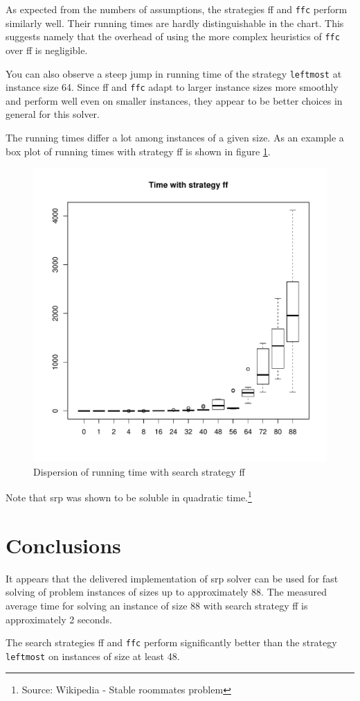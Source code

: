 \documentclass{article}
\newcommand{\code}[1]{\texttt{#1}}
\newcommand{\srp}{\acrshort{srp}}
\begin{document}
As expected from the numbers of assumptions,
the strategies \acrshort{ff} and \code{ffc} perform similarly well.
Their running times are hardly distinguishable in the chart.
This suggests namely that the overhead of using
the more complex heuristics of \code{ffc} over \acrshort{ff} is negligible.

You can also observe a steep jump in running time
of the strategy \code{leftmost} at instance size 64.
Since \acrshort{ff} and \code{ffc} adapt to larger instance sizes more smoothly
and perform well even on smaller instances,
they appear to be better choices in general for this solver.

The running times differ a lot among instances of a given size.
As an example a box plot of running times with strategy \acrshort{ff} is shown
in figure \ref{fig:ff-time}.

\begin{figure}
\centering
\includegraphics[width=\linewidth]{ff_time}
\caption{Dispersion of running time with search strategy \acrshort{ff}}
\label{fig:ff-time}
\end{figure}

Note that \srp{} was shown to be soluble
in quadratic time.\footnote{Source: Wikipedia - Stable roommates problem}

\section{Conclusions}
It appears that the delivered implementation of \srp{} solver can be used
for fast solving of problem instances of sizes up to approximately 88.
The measured average time for solving an instance of size 88
with search strategy \acrshort{ff} is approximately 2 seconds.

The search strategies \acrshort{ff} and \code{ffc}
perform significantly better than the strategy \code{leftmost}
on instances of size at least 48.

\printglossaries{}
\end{document}
